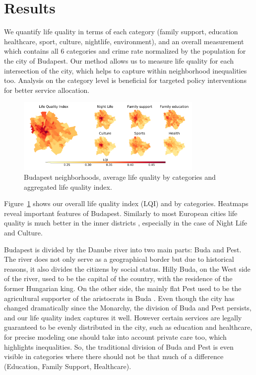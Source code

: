 \section{Results}
We quantify life quality in terms of each category (family support, education healthcare, sport, culture, nightlife, environment), and an overall measurement which contains all 6 categories and crime rate normalized by the population for the city of Budapest. Our method allows us to measure life quality for each intersection of the city, which helps to capture within neighborhood inequalities too. Analysis on the category level is beneficial for targeted policy interventions for better service allocation.

\begin{figure}[htbp]
	\centering
	\includegraphics[width=0.8\textwidth]{images/lqi/Budapest_LQI_Neighborhoods-eps-converted-to.pdf}
	\caption{Budapest neighborhoods, average life quality by categories and aggregated life quality index.}
	\label{fig:BPlqi}
\end{figure}

Figure~\ref{fig:BPlqi} shows our overall life quality index (LQI) and by categories. Heatmaps reveal important features of Budapest. Similarly to most European cities life quality is much better in the inner districts \cite{Hohenberg1986,Brueckner1999}, especially in the case of Night Life and Culture.

Budapest is divided by the Danube river into two main parts: Buda and Pest. The river does not only serve as a geographical border but due to historical reasons, it also divides the citizens by social status. Hilly Buda, on the West side of the river, used to be the capital of the country, with the residence of the former Hungarian king. On the other side, the mainly flat Pest used to be the agricultural supporter of the aristocrats in Buda \cite{Gyani}. Even though the city has changed dramatically since the Monarchy, the division of Buda and Pest persists, and our life quality index captures it well. However certain services are legally guaranteed to be evenly distributed in the city, such as education and healthcare, for precise modeling one should take into account private care too, which highlights inequalities. So, the traditional division of Buda and Pest is even visible in categories where there should not be that much of a difference (Education, Family Support, Healthcare).

